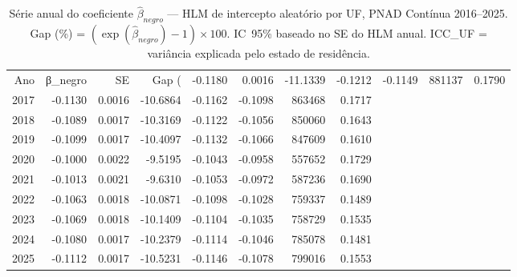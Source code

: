 \begin{table}
\caption{Série anual do coeficiente $\hat{\beta}_{negro}$ — HLM de intercepto aleatório por UF, PNAD Contínua 2016--2025. Gap (\%) = $(\exp(\hat{\beta}_{negro}) - 1) \times 100$. IC~95\% baseado no SE do HLM anual. ICC\_UF = variância explicada pelo estado de residência.}
\label{tab:tendencia_serie_anual}
\begin{tabular}{rrrrrrrr}
\toprule
Ano & β_negro & SE & Gap (%
 & -0.1180 & 0.0016 & -11.1339 & -0.1212 & -0.1149 & 881137 & 0.1790 \\
2017 & -0.1130 & 0.0016 & -10.6864 & -0.1162 & -0.1098 & 863468 & 0.1717 \\
2018 & -0.1089 & 0.0017 & -10.3169 & -0.1122 & -0.1056 & 850060 & 0.1643 \\
2019 & -0.1099 & 0.0017 & -10.4097 & -0.1132 & -0.1066 & 847609 & 0.1610 \\
2020 & -0.1000 & 0.0022 & -9.5195 & -0.1043 & -0.0958 & 557652 & 0.1729 \\
2021 & -0.1013 & 0.0021 & -9.6310 & -0.1053 & -0.0972 & 587236 & 0.1690 \\
2022 & -0.1063 & 0.0018 & -10.0871 & -0.1098 & -0.1028 & 759337 & 0.1489 \\
2023 & -0.1069 & 0.0018 & -10.1409 & -0.1104 & -0.1035 & 758729 & 0.1535 \\
2024 & -0.1080 & 0.0017 & -10.2379 & -0.1114 & -0.1046 & 785078 & 0.1481 \\
2025 & -0.1112 & 0.0017 & -10.5231 & -0.1146 & -0.1078 & 799016 & 0.1553 \\
\bottomrule
\end{tabular}
\end{table}
